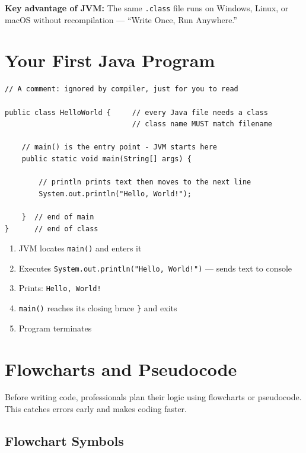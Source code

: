 \documentclass[12pt,a4paper,oneside]{book}
\begin{document}
\textbf{Key advantage of JVM:} The same \texttt{.class} file runs on Windows, Linux, or macOS without recompilation --- ``Write Once, Run Anywhere.''

\section{Your First Java Program}

\begin{lstlisting}[caption={Hello World in Java --- Every line explained}]
// A comment: ignored by compiler, just for you to read

public class HelloWorld {     // every Java file needs a class
                              // class name MUST match filename

    // main() is the entry point - JVM starts here
    public static void main(String[] args) {

        // println prints text then moves to the next line
        System.out.println("Hello, World!");

    }  // end of main
}      // end of class
\end{lstlisting}

\begin{dryrun}
\begin{enumerate}
  \item JVM locates \texttt{main()} and enters it
  \item Executes \texttt{System.out.println("Hello, World!")} --- sends text to console
  \item Prints: \texttt{Hello, World!}
  \item \texttt{main()} reaches its closing brace \texttt{\}} and exits
  \item Program terminates
\end{enumerate}
\end{dryrun}

\section{Flowcharts and Pseudocode}

Before writing code, professionals plan their logic using flowcharts or pseudocode. This catches errors early and makes coding faster.

\subsection{Flowchart Symbols}
\end{document}
